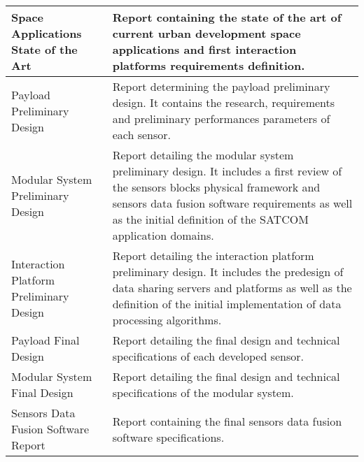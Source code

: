 \begin{longtable}[H]{>{\raggedright\arraybackslash}p{4cm} p{10cm}}
	\midrule

	Space Applications State of the Art & Report containing the state of the art of current urban development space applications and first interaction platforms requirements definition.\vspace{0.2cm} \\
	
	\midrule

	Payload Preliminary Design  & Report determining the payload preliminary design. It contains the research, requirements and preliminary performances parameters of each sensor.\vspace{0.2cm} \\
	
	\midrule

	Modular System Preliminary Design  & Report detailing the modular system preliminary design. It includes a first review of the sensors blocks physical framework and sensors data fusion software requirements as well as the initial definition of the SATCOM application domains.\vspace{0.2cm} \\
	
	\midrule

	Interaction Platform Preliminary Design  & Report detailing the interaction platform preliminary design. It includes the predesign of data sharing servers and platforms as well as the definition of the initial implementation of data processing algorithms.\vspace{0.2cm} \\
	
	\midrule
	
	Payload Final Design  & Report detailing the final design and technical specifications of each developed sensor.\vspace{0.2cm} \\
	
	\midrule

	Modular System  Final Design  & Report detailing the final design and technical specifications of the modular system.\vspace{0.2cm} \\ 
	
	\midrule

	Sensors Data Fusion Software Report  & Report containing the final sensors data fusion software specifications.\vspace{0.2cm} \\
	
	\midrule


\end{longtable}
